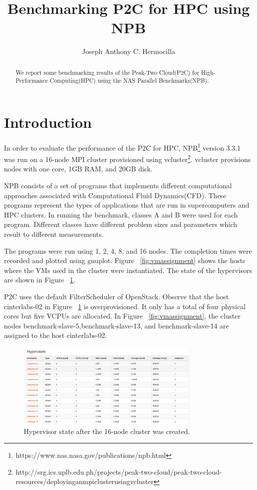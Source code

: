 \documentclass[a4paper]{article}
\title{Benchmarking P2C for HPC using NPB}
\author{Joseph Anthony C. Hermocilla}
\begin{document}
\maketitle

\begin{abstract}
We report some benchmarking results of the Peak-Two Cloud(P2C) for High-Performance Computing(HPC) using the NAS Parallel Benchmarks(NPB).
\end{abstract}

\section{Introduction}

In order to evaluate the performance of the P2C\cite{hermocilla-p2c-ncite2014} for HPC, NPB\footnote{https://www.nas.nasa.gov/publications/npb.html} version 3.3.1 was run on a 16-node MPI cluster provisioned using vcluster\footnote{http://srg.ics.uplb.edu.ph/projects/peak-two-cloud/peak-two-cloud-resources/deployinganmpiclusterusingvcluster}. vcluster provisions nodes with one core, 1GB RAM, and 20GB disk.

NPB consists of a set of programs that implements different computational approaches associated with Computational Fluid Dynamics(CFD). These programs represent the types of applications that are run in supercomputers and HPC clusters. In running the benchmark, classes A and B were used for each program. Different classes have different problem sizes and parameters which result to different measurements.

The programs were run using 1, 2, 4, 8, and 16 nodes. The completion times were recorded and plotted using gnuplot. Figure ~\ref{fig:vmassignment} shows the hosts where the VMs used in the cluster were instantiated. The state of the hypervisors are shown in Figure ~\ref{fig:hypervisors}.

P2C uses the default FilterScheduler of OpenStack. Observe that the host cinterlabs-02 in Figure ~\ref{fig:hypervisors} is overprovisioned. It only has a total of four physical cores but five VCPUs are allocated. In Figure ~\ref{fig:vmassignment}, the cluster nodes benchmark-slave-5,benchmark-slave-13, and benchmark-slave-14 are assigned to the host cinterlabs-02.

\begin{figure}[H]
\centering
\includegraphics[width=0.8\textwidth]{figures/p2c-allocation.png}
\caption{\label{fig:hypervisors} Hypervisor state after the 16-node cluster was created.}
\end{figure}
\end{document}
